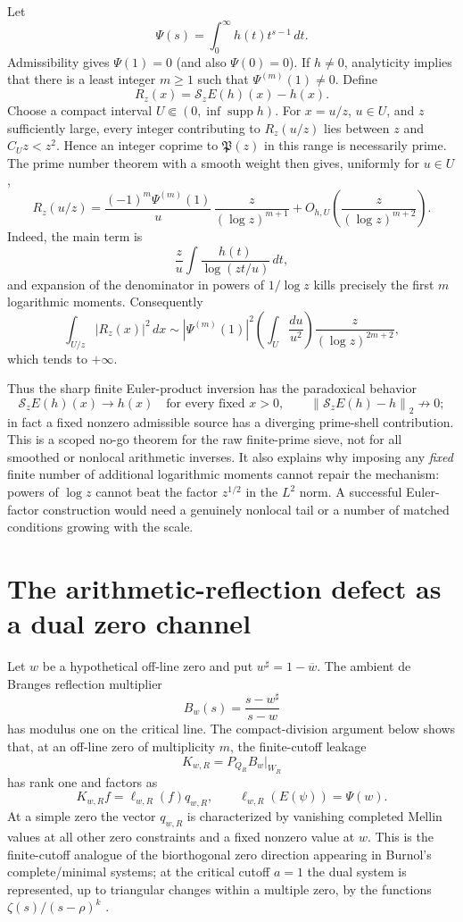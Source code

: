 \documentclass[11pt]{article}
\theoremstyle{remark}
\newcommand{\norm}[1]{\left\lVert #1\right\rVert}
\begin{document}
Let
\[
 \Psi(s)=\int_0^\infty h(t)t^{s-1}\,dt.
\]
Admissibility gives $\Psi(1)=0$ (and also $\Psi(0)=0$). If $h\ne0$, analyticity implies that there is a least integer $m\ge1$ such that $\Psi^{(m)}(1)\ne0$. Define
\[
 R_z(x)=\mathcal S_zE(h)(x)-h(x).
\]
Choose a compact interval $U\Subset(0,\inf\operatorname{supp}h)$. For $x=u/z$, $u\in U$, and $z$ sufficiently large, every integer contributing to $R_z(u/z)$ lies between $z$ and $C_Uz<z^2$. Hence an integer coprime to $\mathfrak P(z)$ in this range is necessarily prime. The prime number theorem with a smooth weight then gives, uniformly for $u\in U$,
\begin{equation}\label{eq:prime-shell-asymp}
 R_z(u/z)
 =\frac{(-1)^m\Psi^{(m)}(1)}{u}\,
   \frac{z}{(\log z)^{m+1}}
 +O_{h,U}\!\left(\frac{z}{(\log z)^{m+2}}\right).
\end{equation}
Indeed, the main term is
\[
 \frac zu\int \frac{h(t)}{\log(zt/u)}\,dt,
\]
and expansion of the denominator in powers of $1/\log z$ kills precisely the first $m$ logarithmic moments. Consequently
\begin{equation}\label{eq:sieve-R2-divergence}
 \int_{U/z}|R_z(x)|^2\,dx
 \sim
 |\Psi^{(m)}(1)|^2
 \left(\int_U\frac{du}{u^2}\right)
 \frac{z}{(\log z)^{2m+2}},
\end{equation}
which tends to $+\infty$.

Thus the sharp finite Euler-product inversion has the paradoxical behavior
\[
 \mathcal S_zE(h)(x)\to h(x)\quad\text{for every fixed }x>0,
 \qquad
 \norm{\mathcal S_zE(h)-h}_2\not\to0;
\]
in fact a fixed nonzero admissible source has a diverging prime-shell contribution. This is a scoped no-go theorem for the raw finite-prime sieve, not for all smoothed or nonlocal arithmetic inverses. It also explains why imposing any \emph{fixed} finite number of additional logarithmic moments cannot repair the mechanism: powers of $\log z$ cannot beat the factor $z^{1/2}$ in the $L^2$ norm. A successful Euler-factor construction would need a genuinely nonlocal tail or a number of matched conditions growing with the scale.

\section{The arithmetic-reflection defect as a dual zero channel}
Let $w$ be a hypothetical off-line zero and put $w^\sharp=1-\overline w$. The ambient de Branges reflection multiplier
\[
 B_w(s)=\frac{s-w^\sharp}{s-w}
\]
has modulus one on the critical line. The compact-division argument below shows that, at an off-line zero of multiplicity $m$, the finite-cutoff leakage
\[
 K_{w,R}=P_{Q_R}B_w\big|_{W_R}
\]
has rank one and factors as
\[
 K_{w,R}f=\ell_{w,R}(f)q_{w,R},
 \qquad
 \ell_{w,R}(E(\psi))=\Psi(w).
\]
At a simple zero the vector $q_{w,R}$ is characterized by vanishing completed Mellin values at all other zero constraints and a fixed nonzero value at $w$. This is the finite-cutoff analogue of the biorthogonal zero direction appearing in Burnol's complete/minimal systems; at the critical cutoff $a=1$ the dual system is represented, up to triangular changes within a multiple zero, by the functions $\zeta(s)/(s-\rho)^k$ \cite{Burnol2004}.
\end{document}
